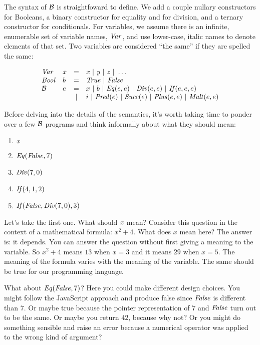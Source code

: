 The syntax of $\mathcal{B}$ is straightfoward to define.  We add a couple
nullary constructors for Booleans, a binary constructor for equality
and for division, and a ternary constructor for conditionals.  For
variables, we assume there is an infinite, enumerable set of variable
names, $\mathit{Var}$, and use lower-case, italic names to denote elements of
that set.  Two variables are considered ``the same'' if they are
spelled the same:

\[
\begin{array}{llcl}
\mathit{Var} & \mvar & = & \s{x}\ |\ \s{y}\ |\ \s{z}\ |\ \dots \\
\mathit{Bool} & \mbool & = & \True\ |\ \False\\
\Barith & e & = & \mvar\ |\ \mbool\ |\ \Eq(e,e)\ |\ \Div(e,e)\ |\ \If(e,e,e)\\
        &   & | & \mint\ |\ \Pred(e)\ |\ \Succ(e)\ |\ \Plus(e,e)\ |\ \Mult(e,e)
\end{array}
\]



Before delving into the details of the semantics, it's worth taking
time to ponder over a few $\mathcal{B}$ programs and think informally
about what they should mean:

\begin{enumerate}\setlength{\itemsep}{0pt}
\item $\mathit{x}$
\item $\mathit{Eq}(\mathit{False},7)$
\item $\mathit{Div}(7,0)$
\item $\mathit{If}(4,1,2)$
\item $\mathit{If}(\mathit{False},\mathit{Div}(7,0),3)$
\end{enumerate}

Let's take the first one.  What should $\mathit{x}$ mean?  Consider this
question in the context of a mathematical formula: $x^2+4$.  What does
$x$ mean here?  The answer is: it depends.  You can answer the
question without first giving a meaning to the variable.  So $x^2+4$
means $13$ when $x=3$ and it means $29$ when $x=5$.  The meaning of
the formula varies with the meaning of the variable.  The same should
be true for our programming language.

What about $\mathit{Eq}(\mathit{False},7)$?  Here you could make different design
choices.  You might follow the JavaScript approach and produce false
since $\mathit{False}$ is different than $7$.  Or maybe true because the
pointer representation of $7$ and $\mathit{False}$ turn out to be the same.
Or maybe you return $42$, because why not?  Or you might do something
sensible and raise an error because a numerical operator was applied
to the wrong kind of argument?

